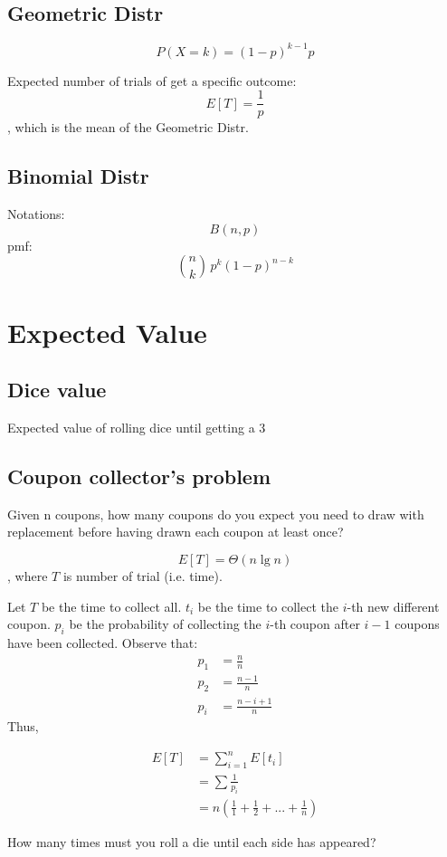 \subsection{Geometric Distr}
$$
P(X=k) = (1-p)^{k-1}p
$$

Expected number of trials of get a specific outcome:
$$
E[T] = \frac{1}{p}
$$
, which is the mean of the Geometric Distr. 
\subsection{Binomial Distr}
Notations:
$$
B(n, p)
$$
pmf:
$$
{n \choose k}\,p^{k}(1-p)^{n-k}
$$

\section{Expected Value}
\subsection{Dice value}
Expected value of rolling dice until getting a 3
\subsection{Coupon collector's problem}
Given n coupons, how many coupons do you expect you need to draw with replacement before having drawn each coupon at least once?

$$
E[T] = \Theta(n \lg n)
$$
, where $T$ is number of trial (i.e. time).

Let $T$ be the time to collect all. $t_i$ be the time to collect the $i$-th new different coupon. $p_i$ be the probability of collecting the $i$-th coupon after $i-1$ coupons have been collected. Observe that:
\begin{align*}
p_1 &= \frac{n}{n} \\ 
p_2 &= \frac{n-1}{n} \\
p_i &= \frac{n-i+1}{n}
\end{align*}
Thus,

\begin{align*}
E[T] &= \sum_{i=1}^n E[t_i] \\
&= \sum \frac{1}{p_i} \\
&= n(\frac{1}{1}+\frac{1}{2}+...+\frac{1}{n})
\end{align*}

 How many times must you roll a die until each side has appeared?
